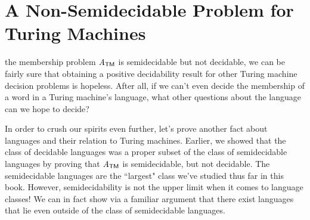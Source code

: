 \section{A Non-Semidecidable Problem for Turing Machines}\label{sec:nonsemidecidableTM}

 the membership problem $\mathit{A}_{\textsf{TM}}$ is semidecidable but not decidable, we can be fairly sure that obtaining a positive decidability result for other Turing machine decision problems is hopeless. After all, if we can't even decide the membership of a word in a Turing machine's language, what other questions about the language can we hope to decide?

In order to crush our spirits even further, let's prove another fact about languages and their relation to Turing machines. Earlier, we showed that the class of decidable languages was a proper subset of the class of semidecidable languages by proving that $\mathit{A}_{\textsf{TM}}$ is semidecidable, but not decidable. The semidecidable languages are the ``largest" class we've studied thus far in this book. However, semidecidability is not the upper limit when it comes to language classes! We can in fact show via a familiar argument that there exist languages that lie even outside of the class of semidecidable languages.

